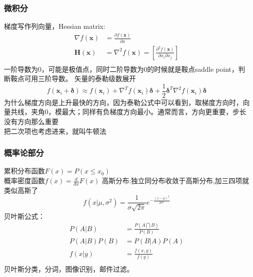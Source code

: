 \documentclass[UTF8]{article}
\begin{document}
\subsubsection{微积分}
梯度写作列向量，Hessian matrix: 
\begin{equation}
\label{hessian}
\begin{split}
 \nabla f(\mathbf x)&= \frac{\partial f(\mathbf x)}{\partial x}\\
\mathbf H (\mathbf x)&= \nabla ^2 f(\mathbf x)=\left[ \frac{\partial ^2 f(\mathbf x)}{\partial x_i \partial x_j} \right]\\
\end{split}
\end{equation}
 一阶导数为0，可能是极值点，同时二阶导数为0的时候就是鞍点saddle point，判断鞍点可用三阶导数。
矢量的泰勒级数展开
\begin{equation}
\label{taylor}
f(\mathbf x_i +\mathbf \delta) \approx f(\mathbf x_i)+
\nabla ^T f(\mathbf x_i) \mathbf \delta +
\frac{1}{2}\mathbf \delta ^T \nabla ^2 f(\mathbf x_i)\mathbf \delta
\end{equation}
为什么梯度方向是上升最快的方向，因为泰勒公式中可以看到，取梯度方向时，向量共线，夹角0，模最大；同样有负梯度方向最小。通常而言，方向更重要，步长没有方向那么重要\\
把二次项也考虑进来，就叫牛顿法

\subsubsection{概率论部分}
累积分布函数$F(x)=P(x \leqslant x_0)$\\
概率密度函数$f(x)=\frac{d}{dx}F(x)$
高斯分布:独立同分布收敛于高斯分布,加三四项就类似高斯了
\begin{equation}
\label{}
f(x| \mu ,\sigma^2)= \frac{1}{\sigma \sqrt{2\pi}}e^{-\frac{(x-\mu)^2}{2\sigma^2}}
\end{equation}
贝叶斯公式：
\begin{equation}
\label{}
\begin{split}
    P(A|B) &= \frac{P(A \bigcap B )}{P(B)}\\
    P(A|B) P(B)&= P(B|A) P(A)  \\
    f(x|y) &= \frac{f(x,y)}{f(y)}\\
\end{split}
\end{equation}
贝叶斯分类，分词，图像识别，邮件过滤。
\end{document}
